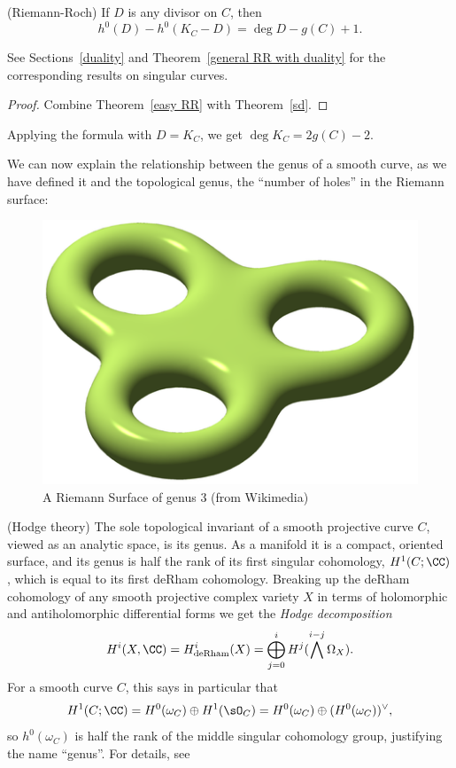 \begin{theorem} (Riemann-Roch)\label{RR theorem}
If $D$ is any divisor on $C$, then 
$$
h^0(D) - h^0(K_C -D) = \deg D - g(C) +1.
$$
\end{theorem}
See Sections~\ref{duality} and Theorem~\ref{general RR with duality} for the corresponding results on singular curves.

\begin{proof}
Combine Theorem~\ref{easy RR} with Theorem~\ref{sd}.
\end{proof}
Applying the formula with $D = K_C$, we get 
$\deg K_C = 2g(C) -2$.

We can now explain the relationship between the genus of a smooth curve, as we have defined it and the 
topological genus, the ``number of holes'' in the Riemann surface:


\begin{figure}[htbp]
\begin{center}
\includegraphics[scale = 1]{RiemannSurface}
\caption{A Riemann Surface of genus 3 (from Wikimedia)}
\label{RiemannSurface}
\end{center}
\end{figure}


\begin{fact} (Hodge theory)
The sole topological invariant of a smooth projective curve $C$, viewed as an analytic space, is its genus. As a manifold it is a compact, oriented surface, and its genus is half the rank of its first singular cohomology, $H^{1}(C; \CC)$, which is equal to its first deRham cohomology.
Breaking up the deRham cohomology of any smooth projective complex variety $X$ in terms of holomorphic and antiholomorphic differential
forms we get the \emph{Hodge decomposition}
$$
H^i(X,\CC) = H^i_{\rm de Rham}(X) = \bigoplus_{j=0}^i H^j(\bigwedge^{i-j} \Omega_X).
$$
For a smooth curve $C$, this says in  particular that
$$
H^1(C; \CC) = H^0(\omega_C)\oplus H^1(\sO_C) = H^0(\omega_C)\oplus (H^0(\omega_C))^\vee, 
$$
so $ h^0(\omega_C)$ is half the rank of the middle singular cohomology group, justifying the name ``genus''. For details, see~\cite[p. 116]{Griffiths-Harris1978}
\end{fact}


